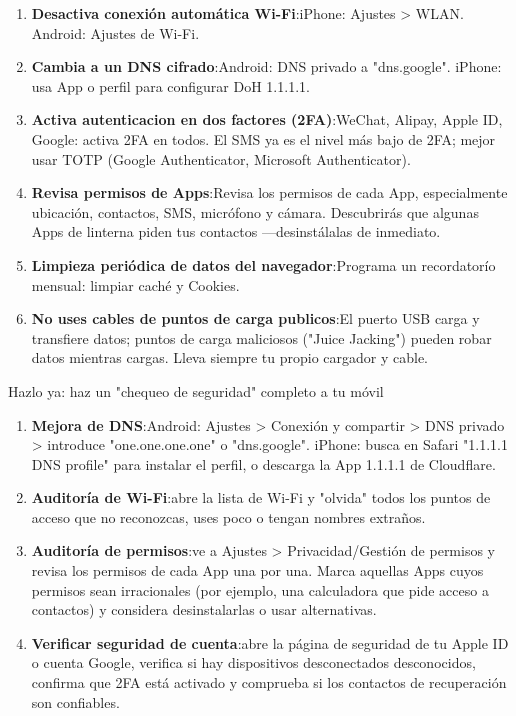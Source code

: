 \begin{enumerate}
  \item \textbf{Desactiva conexión automática Wi-Fi}:iPhone: Ajustes > WLAN. Android: Ajustes de Wi-Fi.
  \item \textbf{Cambia a un DNS cifrado}:Android: DNS privado a "dns.google". iPhone: usa App o perfil para configurar DoH 1.1.1.1.
  \item \textbf{Activa autenticacion en dos factores (2FA)}:WeChat, Alipay, Apple ID, Google: activa 2FA en todos. El SMS ya es el nivel más bajo de 2FA; mejor usar TOTP (Google Authenticator, Microsoft Authenticator).
  \item \textbf{Revisa permisos de Apps}:Revisa los permisos de cada App, especialmente ubicación, contactos, SMS, micrófono y cámara. Descubrirás que algunas Apps de linterna piden tus contactos —desinstálalas de inmediato.
  \item \textbf{Limpieza periódica de datos del navegador}:Programa un recordatorío mensual: limpiar caché y Cookies.
  \item \textbf{No uses cables de puntos de carga publicos}:El puerto USB carga y transfiere datos; puntos de carga maliciosos ("Juice Jacking") pueden robar datos mientras cargas. Lleva siempre tu propio cargador y cable.
\end{enumerate}

\begin{tcbpractice}{Hazlo ya: haz un "chequeo de seguridad" completo a tu móvil}
\begin{enumerate}
  \item \textbf{Mejora de DNS}:Android: Ajustes > Conexión y compartir > DNS privado > introduce "one.one.one.one" o "dns.google". iPhone: busca en Safari "1.1.1.1 DNS profile" para instalar el perfil, o descarga la App 1.1.1.1 de Cloudflare.
  \item \textbf{Auditoría de Wi-Fi}:abre la lista de Wi-Fi y "olvida" todos los puntos de acceso que no reconozcas, uses poco o tengan nombres extraños.
  \item \textbf{Auditoría de permisos}:ve a Ajustes > Privacidad/Gestión de permisos y revisa los permisos de cada App una por una. Marca aquellas Apps cuyos permisos sean irracionales (por ejemplo, una calculadora que pide acceso a contactos) y considera desinstalarlas o usar alternativas.
  \item \textbf{Verificar seguridad de cuenta}:abre la página de seguridad de tu Apple ID o cuenta Google, verifica si hay dispositivos desconectados desconocidos, confirma que 2FA está activado y comprueba si los contactos de recuperación son confiables.
\end{enumerate}

\end{tcbpractice}
